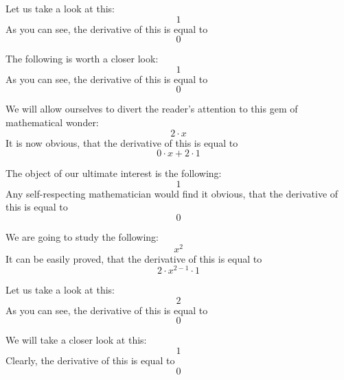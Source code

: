 \documentclass{article}
\begin{document}
Let us take a look at this:
\begin{equation}
1 
\end{equation}
As you can see, the derivative of this is equal to
\begin{equation}
0 
\end{equation}

The following is worth a closer look:
\begin{equation}
1 
\end{equation}
As you can see, the derivative of this is equal to
\begin{equation}
0 
\end{equation}

We will allow ourselves to divert the reader's attention to this gem of mathematical wonder:
\begin{equation}
2 \cdot x 
\end{equation}
It is now obvious, that the derivative of this is equal to
\begin{equation}
0 \cdot x + 2 \cdot 1 
\end{equation}

The object of our ultimate interest is the following:
\begin{equation}
1 
\end{equation}
Any self-respecting mathematician would find it obvious, that the derivative of this is equal to
\begin{equation}
0 
\end{equation}

We are going to study the following:
\begin{equation}
x ^{2 } 
\end{equation}
It can be easily proved, that the derivative of this is equal to
\begin{equation}
2 \cdot x ^{2 - 1 } \cdot 1 
\end{equation}

Let us take a look at this:
\begin{equation}
2 
\end{equation}
As you can see, the derivative of this is equal to
\begin{equation}
0 
\end{equation}

We will take a closer look at this:
\begin{equation}
1 
\end{equation}
Clearly, the derivative of this is equal to
\begin{equation}
0 
\end{equation}
\end{document}
